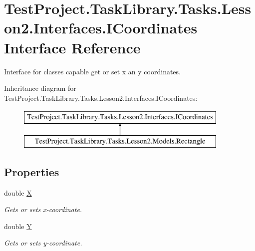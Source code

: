 \hypertarget{interface_test_project_1_1_task_library_1_1_tasks_1_1_lesson2_1_1_interfaces_1_1_i_coordinates}{}\section{Test\+Project.\+Task\+Library.\+Tasks.\+Lesson2.\+Interfaces.\+I\+Coordinates Interface Reference}
\label{interface_test_project_1_1_task_library_1_1_tasks_1_1_lesson2_1_1_interfaces_1_1_i_coordinates}


Interface for classes capable get or set x an y coordinates.  


Inheritance diagram for Test\+Project.\+Task\+Library.\+Tasks.\+Lesson2.\+Interfaces.\+I\+Coordinates\+:\begin{figure}[H]
\begin{center}
\leavevmode
\includegraphics[height=2.000000cm]{interface_test_project_1_1_task_library_1_1_tasks_1_1_lesson2_1_1_interfaces_1_1_i_coordinates}
\end{center}
\end{figure}
\subsection*{Properties}
\begin{DoxyCompactItemize}
\item 
double \mbox{\hyperlink{interface_test_project_1_1_task_library_1_1_tasks_1_1_lesson2_1_1_interfaces_1_1_i_coordinates_a0567201720aa2c9e69674fe5f592f9ae}{X}}
\begin{DoxyCompactList}\small\item\em Gets or sets x-\/coordinate. \end{DoxyCompactList}\item 
double \mbox{\hyperlink{interface_test_project_1_1_task_library_1_1_tasks_1_1_lesson2_1_1_interfaces_1_1_i_coordinates_a2e443670de3e7887be08029d6e4f8d15}{Y}}
\begin{DoxyCompactList}\small\item\em Gets or sets y-\/coordinate. \end{DoxyCompactList}\end{DoxyCompactItemize}



